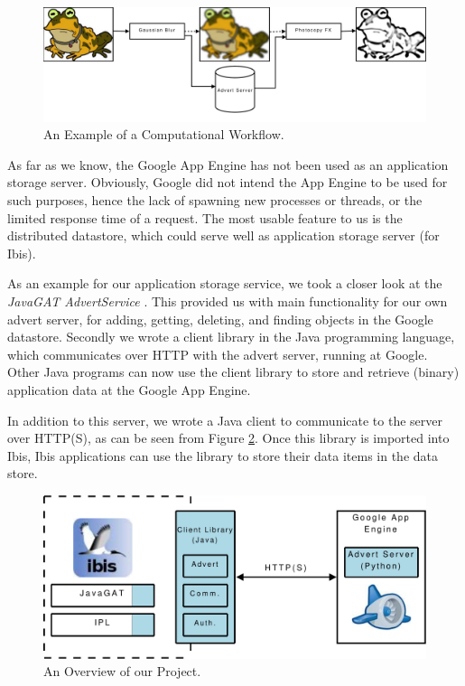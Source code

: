 \begin{figure}[ht] %
\begin{center}
\includegraphics[width=14cm]{./figures/image_workflow.pdf} 
\caption{An Example of a Computational Workflow.\label{img-workflow}}
\end{center}
\end{figure}

As far as we know, the Google App Engine has not been used as an application
storage server. Obviously, Google did not intend the App Engine to be used for
such purposes, hence the lack of spawning new processes or threads, or the
limited response time of a request. The most usable feature to us is the
distributed datastore, which could serve well as application storage
server (for Ibis). 

As an example for our application storage service, we took a closer look at
the \emph{JavaGAT AdvertService} \cite{javagat-www}. This provided us with main
functionality for our own advert server, for adding, getting, deleting, and
finding objects in the Google datastore. Secondly we wrote a client library in
the Java programming language, which communicates over HTTP with the advert
server, running at Google. Other Java programs can now use the client library
to store and retrieve (binary) application data at the Google App Engine.

In addition to this server, we wrote a Java client to communicate to the
server over HTTP(S), as can be seen from Figure \ref{introduction-overview}.
Once this library is imported into Ibis, Ibis applications can use the
library to store their data items in the data store.

\begin{figure}[ht] %
\begin{center}
\includegraphics[width=14cm]{./figures/project_design.pdf} 
\caption{An Overview of our Project.\label{introduction-overview}}
\end{center}
\end{figure}

